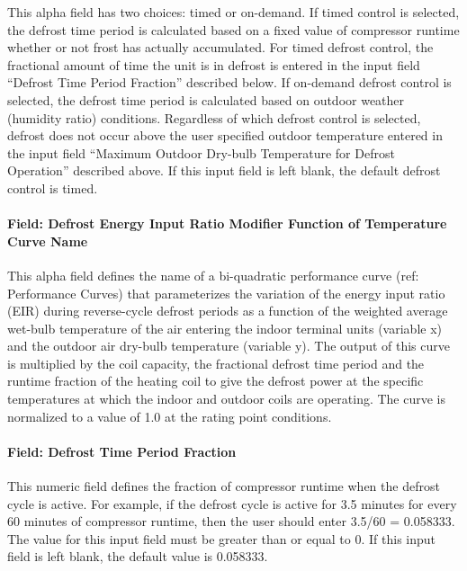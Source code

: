 This alpha field has two choices: timed or on-demand. If timed control is selected, the defrost time period is calculated based on a fixed value of compressor runtime whether or not frost has actually accumulated. For timed defrost control, the fractional amount of time the unit is in defrost is entered in the input field ``Defrost Time Period Fraction'' described below. If on-demand defrost control is selected, the defrost time period is calculated based on outdoor weather (humidity ratio) conditions. Regardless of which defrost control is selected, defrost does not occur above the user specified outdoor temperature entered in the input field ``Maximum Outdoor Dry-bulb Temperature for Defrost Operation'' described above. If this input field is left blank, the default defrost control is timed.

\paragraph{Field: Defrost Energy Input Ratio Modifier Function of Temperature Curve Name}\label{field-defrost-energy-input-ratio-modifier-function-of-temperature-curve-name-1}

This alpha field defines the name of a bi-quadratic performance curve (ref: Performance Curves) that parameterizes the variation of the energy input ratio (EIR) during reverse-cycle defrost periods as a function of the weighted average wet-bulb temperature of the air entering the indoor terminal units (variable x) and the outdoor air dry-bulb temperature (variable y). The output of this curve is multiplied by the coil capacity, the fractional defrost time period and the runtime fraction of the heating coil to give the defrost power at the specific temperatures at which the indoor and outdoor coils are operating. The curve is normalized to a value of 1.0 at the rating point conditions.

\paragraph{Field: Defrost Time Period Fraction}\label{field-defrost-time-period-fraction-1-000}

This numeric field defines the fraction of compressor runtime when the defrost cycle is active. For example, if the defrost cycle is active for 3.5 minutes for every 60 minutes of compressor runtime, then the user should enter 3.5/60 = 0.058333. The value for this input field must be greater than or equal to 0. If this input field is left blank, the default value is 0.058333.

